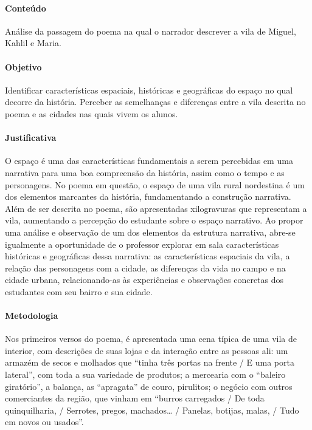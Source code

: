 \documentclass[11pt]{extarticle}
\begin{document}
\paragraph{Conteúdo} Análise da passagem do poema na qual o narrador descrever a vila de Miguel, Kahlil e Maria.

\paragraph{Objetivo} Identificar características espaciais, históricas e geográficas do espaço no qual decorre da história. Perceber as semelhanças e diferenças entre a vila descrita no poema e as cidades nas quais vivem os alunos.

\paragraph{Justificativa} O espaço é uma das características fundamentais a serem percebidas em uma narrativa para uma boa compreensão da história, assim como o tempo e as personagens. No poema em questão, o espaço de uma vila rural nordestina é um dos elementos marcantes da história, fundamentando a construção narrativa. Além de ser descrita no poema, são apresentadas xilogravuras que representam a vila, aumentando a percepção do estudante sobre o espaço narrativo. Ao propor uma análise e observação de um dos elementos da estrutura narrativa, abre-se igualmente a oportunidade de o professor explorar em sala características históricas e geográficas dessa narrativa: as características espaciais da vila, a relação das personagens com a cidade, as diferenças da vida no campo e na cidade urbana, relacionando-as às experiências e observações concretas dos estudantes com seu bairro e sua cidade.

\paragraph{Metodologia} Nos primeiros versos do poema, é apresentada uma cena típica de uma vila de interior, com descrições de suas lojas e da interação entre as pessoas ali: um armazém de secos e molhados que ``tinha três portas na frente / E uma porta lateral'', com toda a sua variedade de produtos; a mercearia com o ``baleiro giratório'', a balança, as ``apragata'' de couro, pirulitos; o negócio com outros comerciantes da região, que vinham em ``burros carregados / De toda quinquilharia, / Serrotes, pregos, machados\ldots{} / 
Panelas, botijas, malas, / Tudo em novos ou usados''.
\end{document}
